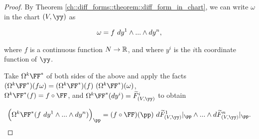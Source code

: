 \begin{proof}
     By Theorem \ref{ch::diff_forms::theorem::diff_form_in_chart}, we can write $\omega$ in the chart $(V, \yy)$ as
    
    \begin{align*}
        \omega = f \text{ } dy^1 \wedge ... \wedge dy^n,
    \end{align*}
    
    where $f$ is a continuous function $N \rightarrow \mathbb{R}$, and where $y^i$ is the $i$th coordinate function of $\yy$.
    
    
    
   Take $\Omega^k \FF^*$ of both sides of the above and apply the facts ${(\Omega^k \FF^*)(f \omega) = (\Omega^k \FF^*)(f) \spc (\Omega^k \FF^*)(\omega)}$, \\ $\Omega^k \FF^*(f) = f \circ \FF$, and $\Omega^k \FF^*(dy^i) = \tF_{(V, \yy)}^i$ to obtain
    
    \begin{align*}
        \Big(\Omega^k \FF^*(f \spc dy^1 \wedge ... \wedge dy^n ) \Big)_\pp = (f \circ \FF)(\pp) \spc 
        d\tF_{(V, \yy)}^1|_\pp \wedge ... \wedge d\tF_{(V, \yy)}^n|_\pp.
    \end{align*}
    
    
    
    

\end{proof}
